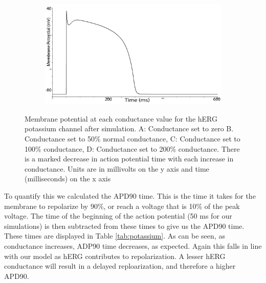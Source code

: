 \documentclass[11pt]{article}
\begin{document}
\begin{figure}[H]
\begin{subfigure}{0.45\textwidth}
		\caption{}
		\label{exp1:c}
	\end{subfigure}
	\begin{subfigure}{0.45\textwidth}
		\centering
		\includegraphics[width = \textwidth]{figs/200gkredit.png}
		\caption{}
		\label{exp1:d}
	\end{subfigure}
	\caption{Membrane potential at each conductance value for the hERG potassium channel after simulation. A: Conductance set to zero B. Conductance set to 50\% normal conductance, C: Conductance set to 100\% conductance, D: Conductance set to 200\% conductance. There is a marked decrease in action potential time with each increase in conductance. Units are in millivolts on the y axis and time (milliseconds) on the x axis}
	\label{fig:exp1}
\end{figure}
\par{}
To quantify this we calculated the APD90 time. This is the time it takes for the membrane to repolarize by 90\%, or reach a voltage that is 10\% of the peak voltage. The time of the beginning of the action potential (50 ms for our simulations) is then subtracted from these times to give us the APD90 time. These times are displayed in Table \ref{tab:potassium}. As can be seen, as conductance increases, ADP90 time decreases, as expected. Again this falls in line with our model as hERG contributes to repolarization. A lesser hERG conductance will result in a delayed reploarization, and therefore a higher APD90.
\end{document}
